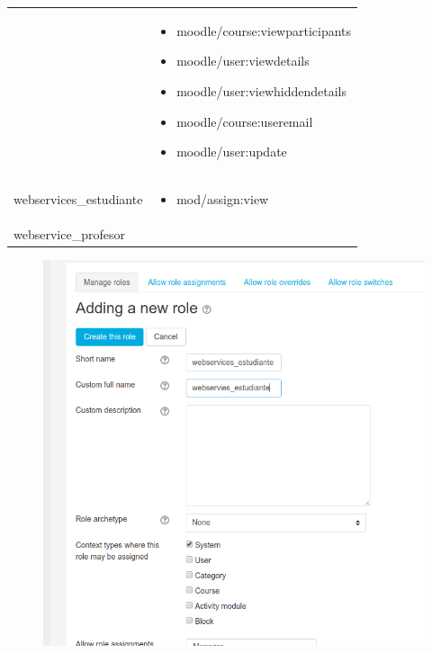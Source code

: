 \begin{enumerate}
\begin{tabular}{|p{5cm}|p{8cm}|}
 &
 
\begin{itemize}
\item moodle/course:viewparticipants
\item moodle/user:viewdetails
\item moodle/user:viewhiddendetails
\item moodle/course:useremail
\item moodle/user:update

\end{itemize}
  \\
webservices\_estudiante
\newline

 &
 
\begin{itemize}
\item mod/assign:view
\end{itemize}
  \\
webservice\_profesor
\newline

 &
 

  \\
  \hline
\end{tabular}


\begin{figure}[H] %
\centering
\includegraphics[scale=0.4]{imagenes/moodle/Screenshot_2017-08-25_11-11-23.png}  %


\end{figure}
\end{enumerate}

